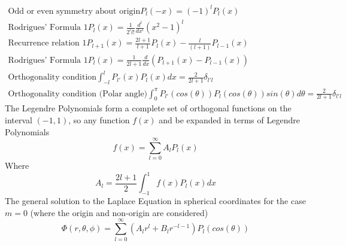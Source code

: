 \documentclass[12pt]{article}
\begin{document}
        \begin{gather*}
            \text{Odd or even symmetry about origin} P_l(-x) = (-1)^l P_l(x) 
            \\ \text{Rodrigues' Formula 1} P_l(x) = \frac{1}{2^l l!} \frac{d^l}{dx^l} (x^2 - 1)^l
            \\ \text{Recurrence relation 1} P_{l+1}(x) = \frac{2 l + 1}{l+1} P_l(x) - \frac{l}{(l+1)} P_{l-1}(x)
            \\ \text{Rodrigues' Formula 1} P_l(x) = \frac{1}{2 l + 1} \frac{d}{dx} (P_{l+1}(x) - P_{l-1}(x))
            \\ \text{Orthogonality condition} \int_{-l}^l P_{l'}(x) P_l(x)dx = \frac{2}{2l + 1} \delta_{l'l}
            \\ \text{Orthogonality condition (Polar angle)} \int_0^\pi P_{l'}(cos(\theta)) P_l(cos(\theta)) sin(\theta) d\theta = \frac{2}{2l+1}\delta_{l'l}
        \end{gather*}
        The Legendre Polynomials form a complete set of orthogonal functions on the interval $(-1,1)$, so any function $f(x)$ and be expanded in terms of Legendre Polynomials
        \begin{equation} \label{eq: a2-41}
            f(x) = \sum_{l=0}^\infty A_l P_l(x)
        \end{equation}
        Where 
        \begin{equation} \label{eq: a2-42}
            A_l = \frac{2l+1}{2} \int_{-1}^1 f(x) P_l(x) dx
        \end{equation}
        The general solution to the Laplace Equation in spherical coordinates for the case $m=0$ (where the origin and non-origin are considered)
        \begin{equation} \label{eq: a2-43}
            \Phi(r,\theta, \phi) = \sum_{l=0}^\infty (A_l r^l + B_l r^{-l-1}) P_l(cos(\theta))
        \end{equation}
\newpage
\printbibliography
\end{document}
